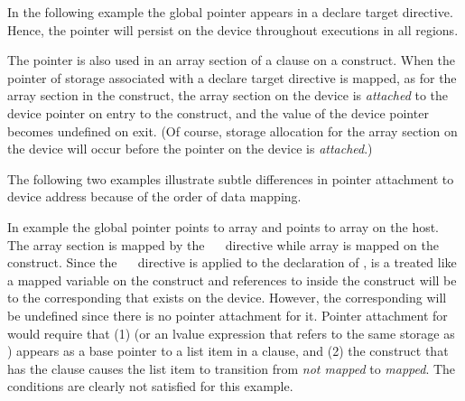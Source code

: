
In the following example the global pointer  appears in a
declare target directive.  Hence, the pointer  will 
persist on the device throughout executions in all  regions.

The pointer is also used in an array section of a  clause on 
a  construct.  When the pointer of storage associated with 
a declare target directive
is mapped, as for the array section  in the
 construct, the array section on the device is \emph{attached}
to the device pointer  on entry to the construct, and
the value of the device pointer  becomes undefined on exit. 
(Of course, storage allocation for
the array section on the device will occur before the 
pointer on the device is \emph{attached}.)



The following two examples illustrate subtle differences in pointer attachment
to device address because of the order of data mapping.

In example  
the global pointer  points to array  and  points to
array  on the host.
The array section  is mapped by the ~~ directive while array  is mapped
on the  construct. 
Since the ~~ directive is applied to the declaration
of ,  is a treated like a mapped variable on the 
construct and references to  inside the construct will be to the
corresponding  that exists on the device.  However, the corresponding
 will be undefined since there is no pointer attachment for it. Pointer
attachment for  would require that (1)  (or an lvalue
expression that refers to the same storage as ) appears as a base
pointer to a list item in a  clause, and (2) the construct that has
the  clause causes the list item to transition from \emph{not mapped}
to \emph{mapped}. The conditions are clearly not satisfied for this example.

